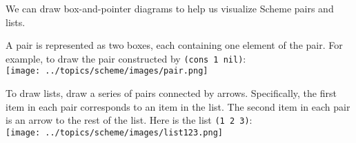 We can draw box-and-pointer diagrams to help us visualize Scheme pairs and
lists.

A pair is represented as two boxes, each containing one element of the pair.
For example, to draw the pair constructed by \texttt{(cons 1 nil)}: \\
\texttt{[image: ../topics/scheme/images/pair.png]}

To draw lists, draw a series of pairs connected by arrows.
Specifically, the first item in each pair corresponds to an item in the list.
The second item in each pair is an arrow to the rest of the list. Here is the
list \texttt{(1 2 3)}: \\
\texttt{[image: ../topics/scheme/images/list123.png]}
